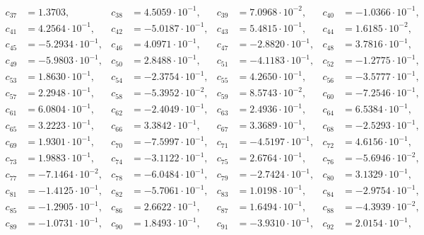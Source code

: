 \begin{align*}
c_{ 37 } &= 1.3703, & c_{ 38 } &= 4.5059 \cdot 10^{ -1 }, & c_{ 39 } &= 7.0968 \cdot 10^{ -2 }, & c_{ 40 } &= -1.0366 \cdot 10^{ -1 },\\ 
c_{ 41 } &= 4.2564 \cdot 10^{ -1 }, & c_{ 42 } &= -5.0187 \cdot 10^{ -1 }, & c_{ 43 } &= 5.4815 \cdot 10^{ -1 }, & c_{ 44 } &= 1.6185 \cdot 10^{ -2 },\\ 
c_{ 45 } &= -5.2934 \cdot 10^{ -1 }, & c_{ 46 } &= 4.0971 \cdot 10^{ -1 }, & c_{ 47 } &= -2.8820 \cdot 10^{ -1 }, & c_{ 48 } &= 3.7816 \cdot 10^{ -1 },\\ 
c_{ 49 } &= -5.9803 \cdot 10^{ -1 }, & c_{ 50 } &= 2.8488 \cdot 10^{ -1 }, & c_{ 51 } &= -4.1183 \cdot 10^{ -1 }, & c_{ 52 } &= -1.2775 \cdot 10^{ -1 },\\ 
c_{ 53 } &= 1.8630 \cdot 10^{ -1 }, & c_{ 54 } &= -2.3754 \cdot 10^{ -1 }, & c_{ 55 } &= 4.2650 \cdot 10^{ -1 }, & c_{ 56 } &= -3.5777 \cdot 10^{ -1 },\\ 
c_{ 57 } &= 2.2948 \cdot 10^{ -1 }, & c_{ 58 } &= -5.3952 \cdot 10^{ -2 }, & c_{ 59 } &= 8.5743 \cdot 10^{ -2 }, & c_{ 60 } &= -7.2546 \cdot 10^{ -1 },\\ 
c_{ 61 } &= 6.0804 \cdot 10^{ -1 }, & c_{ 62 } &= -2.4049 \cdot 10^{ -1 }, & c_{ 63 } &= 2.4936 \cdot 10^{ -1 }, & c_{ 64 } &= 6.5384 \cdot 10^{ -1 },\\ 
c_{ 65 } &= 3.2223 \cdot 10^{ -1 }, & c_{ 66 } &= 3.3842 \cdot 10^{ -1 }, & c_{ 67 } &= 3.3689 \cdot 10^{ -1 }, & c_{ 68 } &= -2.5293 \cdot 10^{ -1 },\\ 
c_{ 69 } &= 1.9301 \cdot 10^{ -1 }, & c_{ 70 } &= -7.5997 \cdot 10^{ -1 }, & c_{ 71 } &= -4.5197 \cdot 10^{ -1 }, & c_{ 72 } &= 4.6156 \cdot 10^{ -1 },\\ 
c_{ 73 } &= 1.9883 \cdot 10^{ -1 }, & c_{ 74 } &= -3.1122 \cdot 10^{ -1 }, & c_{ 75 } &= 2.6764 \cdot 10^{ -1 }, & c_{ 76 } &= -5.6946 \cdot 10^{ -2 },\\ 
c_{ 77 } &= -7.1464 \cdot 10^{ -2 }, & c_{ 78 } &= -6.0484 \cdot 10^{ -1 }, & c_{ 79 } &= -2.7424 \cdot 10^{ -1 }, & c_{ 80 } &= 3.1329 \cdot 10^{ -1 },\\ 
c_{ 81 } &= -1.4125 \cdot 10^{ -1 }, & c_{ 82 } &= -5.7061 \cdot 10^{ -1 }, & c_{ 83 } &= 1.0198 \cdot 10^{ -1 }, & c_{ 84 } &= -2.9754 \cdot 10^{ -1 },\\ 
c_{ 85 } &= -1.2905 \cdot 10^{ -1 }, & c_{ 86 } &= 2.6622 \cdot 10^{ -1 }, & c_{ 87 } &= 1.6494 \cdot 10^{ -1 }, & c_{ 88 } &= -4.3939 \cdot 10^{ -2 },\\ 
c_{ 89 } &= -1.0731 \cdot 10^{ -1 }, & c_{ 90 } &= 1.8493 \cdot 10^{ -1 }, & c_{ 91 } &= -3.9310 \cdot 10^{ -1 }, & c_{ 92 } &= 2.0154 \cdot 10^{ -1 },\\ 

\end{align*}
